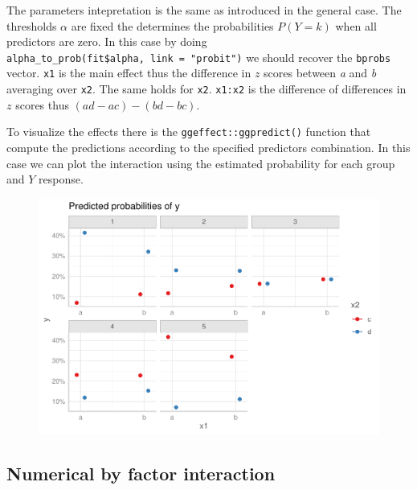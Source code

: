 \documentclass[
  man,floatsintext]{apa6}
\begin{document}
\normalsize

The parameters intepretation is the same as introduced in the general case. The thresholds \(\alpha\) are fixed the determines the probabilities \(P(Y = k)\) when all predictors are zero. In this case by doing \texttt{alpha\_to\_prob(fit\$alpha,\ link\ =\ "probit")} we should recover the \texttt{bprobs} vector. \texttt{x1} is the main effect thus the difference in \(z\) scores between \emph{a} and \emph{b} averaging over \texttt{x2}. The same holds for \texttt{x2}. \texttt{x1:x2} is the difference of differences in \(z\) scores thus \((ad - ac) - (bd - bc)\).

To visualize the effects there is the \texttt{ggeffect::ggpredict()} function that compute the predictions according to the specified predictors combination. In this case we can plot the interaction using the estimated probability for each group and \(Y\) response.

\scriptsize

\begin{figure}

{\centering \includegraphics{paper-new_files/figure-latex/unnamed-chunk-22-1} 

}

\caption{ }\label{fig:unnamed-chunk-22}
\end{figure}

\normalsize

\subsection{Numerical by factor interaction}\label{numerical-by-factor-interaction}
\end{document}
